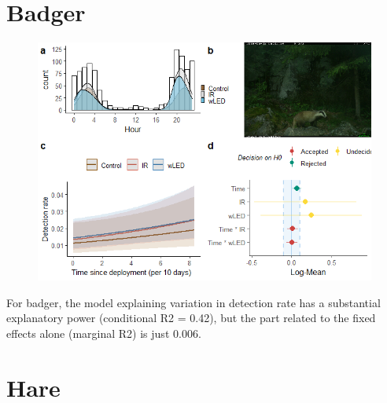 \begin{table}[ht]
\newpage
\section{Badger}


\begin{figure}
		  \centering
	\includegraphics[scale=.9]{../R/glmm_sp_files/figure-html/grevling2-1.png}

\end{figure}

For badger, the model explaining variation in detection rate has a substantial explanatory power (conditional R2 = 0.42), but the part related to the fixed effects alone (marginal R2) is just 0.006. %









\newpage
\section{Hare}



\end{table}
